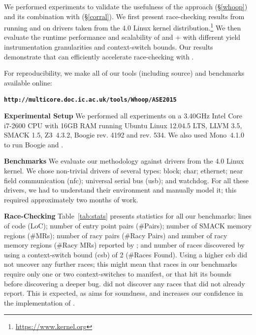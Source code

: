 We performed experiments to validate the usefulness of the \whoop approach (\S\ref{whoop}) and its combination with \corral (\S\ref{corral}). We first present race-checking results from running \whoop and \corral on \sizeOfBenchmarks drivers taken from the 4.0 Linux kernel distribution.\footnote{\url{https://www.kernel.org}} We then evaluate the runtime performance and scalability of \corral and \whoop + \corral with different yield instrumentation granularities and context-switch bounds.
Our results demonstrate that \whoop can efficiently accelerate race-checking with \corral.

For reproducibility, we make all of our tools (including source) and benchmarks available online:

\begin{scriptsize}
\textbf{\texttt{http://multicore.doc.ic.ac.uk/tools/Whoop/ASE2015}}
\end{scriptsize}

\noindent\textbf{Experimental Setup }
%
We performed all experiments on a 3.40GHz Intel Core i7-2600 CPU with 16GB RAM running Ubuntu Linux 12.04.5 LTS, LLVM 3.5, SMACK 1.5, Z3~4.3.2, Boogie rev. 4192 and \corral rev. 534. We also used Mono~4.1.0 to run Boogie and \corral.

\noindent\textbf{Benchmarks }
%
We evaluate our methodology against \sizeOfBenchmarks drivers from the 4.0 Linux kernel. We chose non-trivial drivers of several types: block; char; ethernet; near field communication (nfc); universal serial bus (usb); and watchdog. For all these drivers, we had to understand their environment and manually model it; this required approximately two months of work.

\noindent\textbf{Race-Checking }
%
Table~\ref{tab:stats} presents statistics for all our benchmarks: lines of code (LoC); number of entry point pairs (\#Pairs); number of SMACK memory regions (\#MRs); number of racy pairs (\#Racy Pairs) and number of racy memory regions (\#Racy MRs) reported by \whoop; and number of races discovered by \corral using a context-switch bound (csb) of 2 (\#Races Found). Using a higher csb did not uncover any further races; this might mean that races in our benchmarks require only one or two context-switches to manifest, or that \corral hit its bounds before discovering a deeper bug. \corral did not discover any races that \whoop did not already report.  This is expected, as \whoop aims for soundness, and increases our confidence in the implementation of \whoop.

